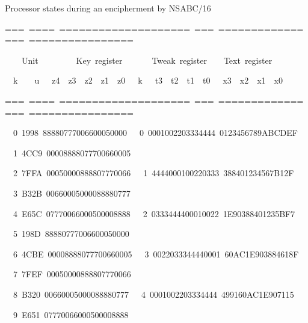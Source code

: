 \documentclass[a4paper,oneside,english]{amsart}
\numberwithin{equation}{section}
\numberwithin{figure}{section}
\newenvironment{lyxcode}
{\par\begin{list}{}{
\setlength{\rightmargin}{\leftmargin}
\setlength{\listparindent}{0pt}\raggedright
\setlength{\itemsep}{0pt}
\setlength{\parsep}{0pt}
\normalfont\ttfamily}\item[]}
{\end{list}}
\begin{document}
\begin{table}
\caption{\label{tab:Contents-of-registers}Processor states during an encipherment
by NSABC/16}

\begin{lyxcode}
{\footnotesize ===~====~====================~===~================~================}{\footnotesize \par}

{\footnotesize{}~~~~Unit~~~~~~~~~Key~register~~~~~~~Tweak~register~~~~Text~register~}{\footnotesize \par}

{\footnotesize{}~~k~~~~u~~~z4~~z3~~z2~~z1~~z0~~~k~~~t3~~t2~~t1~~t0~~~x3~~x2~~x1~~x0}{\footnotesize \par}

{\footnotesize ===~====~====================~===~================~================}{\footnotesize \par}

{\footnotesize{}~~0~1998~88880777006600050000~~~0~0001002203334444~0123456789ABCDEF}{\footnotesize \par}

{\footnotesize{}~~1~4CC9~00008888077700660005}{\footnotesize \par}

{\footnotesize{}~~2~7FFA~00050000888807770066~~~1~4444000100220333~388401234567B12F}{\footnotesize \par}

{\footnotesize{}~~3~B32B~00660005000088880777}{\footnotesize \par}

{\footnotesize{}~~4~E65C~07770066000500008888~~~2~0333444400010022~1E90388401235BF7}{\footnotesize \par}

{\footnotesize{}~~5~198D~88880777006600050000}{\footnotesize \par}

{\footnotesize{}~~6~4CBE~00008888077700660005~~~3~0022033344440001~60AC1E903884618F}{\footnotesize \par}

{\footnotesize{}~~7~7FEF~00050000888807770066}{\footnotesize \par}

{\footnotesize{}~~8~B320~00660005000088880777~~~4~0001002203334444~499160AC1E907115}{\footnotesize \par}

{\footnotesize{}~~9~E651~07770066000500008888}{\footnotesize \par}


\end{lyxcode}
\end{table}
\end{document}
